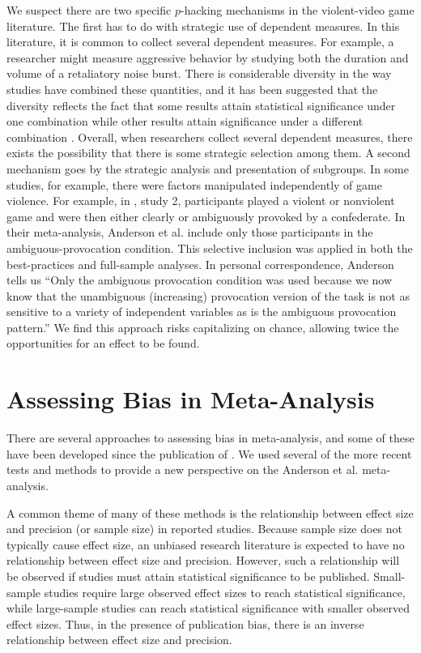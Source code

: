 \documentclass[man]{apa6}
\begin{document}
We suspect there are two specific $p$-hacking mechanisms in the violent-video game literature.  The first has to do with strategic use of dependent measures.  In this literature, it is common to collect several dependent measures.  For example, a researcher might measure aggressive behavior by studying both the duration and volume of a retaliatory noise burst.  There is considerable diversity in the way studies have combined these quantities, and it has been suggested that the diversity reflects the fact that some results attain statistical significance under one combination while other results attain significance under a different combination \citep{Elson:etal:2014}.  Overall, when researchers collect several dependent measures, there exists the possibility that there is some strategic selection among them.  
A second mechanism goes by the strategic analysis and presentation of subgroups.  In some studies, for example, there were factors manipulated independently of game violence. For example, in \citet{Anderson:etal:2004}, study 2, participants played a violent or nonviolent game and were then either clearly or ambiguously provoked by a confederate. In their meta-analysis, Anderson et al. include only those participants in the ambiguous-provocation condition. This selective inclusion was applied in both the best-practices and full-sample analyses. In personal correspondence, Anderson tells us ``Only the ambiguous provocation condition was used because we now know that the unambiguous (increasing) provocation version of the task is not as sensitive to a variety of independent variables as is the ambiguous provocation pattern.'' We find this approach risks capitalizing on chance, allowing twice the opportunities for an effect to be found.

\section{Assessing Bias in Meta-Analysis}
There are several approaches to assessing bias in meta-analysis, and some of these have been developed since the publication of \citet{Anderson:etal:2010}. We used several of the more recent tests and methods to provide a new perspective on the Anderson et al. meta-analysis.

A common theme of many of these methods is the relationship between effect size and precision (or sample size) in reported studies. Because sample size does not typically cause effect size, an unbiased research literature is expected to have no relationship between effect size and precision. However, such a relationship will be observed if studies must attain statistical significance to be published. Small-sample studies require large observed effect sizes to reach statistical significance, while large-sample studies can reach statistical significance with smaller observed effect sizes. Thus, in the presence of publication bias, there is an inverse relationship between effect size and precision. 
\end{document}

